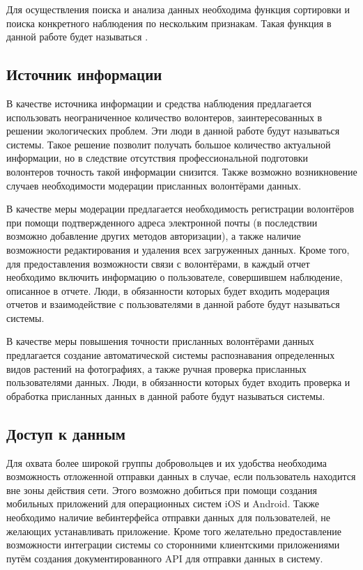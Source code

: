 \nwln
Для осуществления поиска и анализа данных необходима функция сортировки и поиска конкретного наблюдения по нескольким признакам. Такая функция в данной работе будет называться . \\

\subsection{Источник информации}

\tab
В качестве источника информации и средства наблюдения предлагается использовать неограниченное количество волонтеров, заинтересованных в решении экологических проблем.
Эти люди в данной работе будут называться  системы.
Такое решение позволит получать большое количество актуальной информации, но в следствие отсутствия профессиональной подготовки волонтеров точность такой информации снизится.
Также возможно возникновение случаев необходимости модерации присланных волонтёрами данных.

\nwln
В качестве меры модерации предлагается необходимость регистрации волонтёров при помощи подтвержденного адреса электронной почты (в последствии возможно добавление других методов авторизации), а также наличие возможности редактирования и удаления всех загруженных данных.
Кроме того, для предоставления возможности связи с волонтёрами, в каждый отчет необходимо включить информацию о пользователе, совершившем наблюдение, описанное в отчете.
Люди, в обязанности которых будет входить модерация отчетов и взаимодействие с пользователями в данной работе будут называться  системы.

\nwln
В качестве меры повышения точности присланных волонтёрами данных предлагается создание автоматической системы распознавания определенных видов растений на фотографиях, а также ручная проверка присланных пользователями данных.
Люди, в обязанности которых будет входить проверка и обработка присланных данных в данной работе будут называться  системы. \\

\subsection{Доступ к данным}

\tab
Для охвата более широкой группы добровольцев и их удобства необходима возможность отложенной отправки данных в случае, если пользователь находится вне зоны действия сети.
Этого возможно добиться при помощи создания мобильных приложений для операционных систем iOS и Android.
Также необходимо наличие вебинтерфейса отправки данных для пользователей, не желающих устанавливать приложение.
Кроме того желательно предоставление возможности интеграции системы со сторонними клиентскими приложениями путём создания документированного API для отправки данных в систему.

